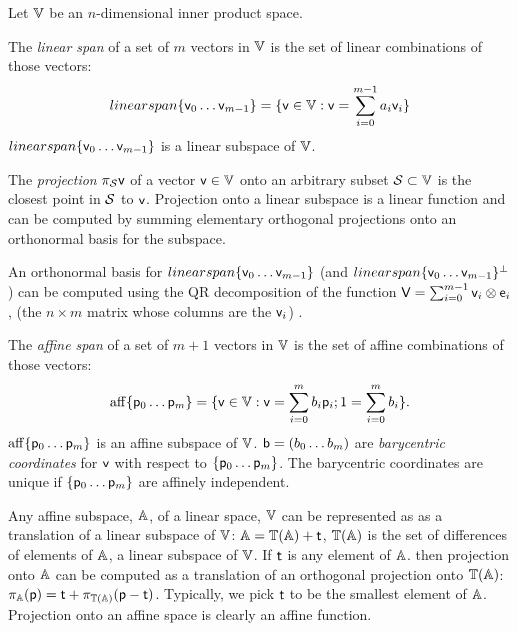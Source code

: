 \label{sec:spans-and-projections}

Let $\mathbb{V}$ be an $n$-dimensional inner product space.

The \textit{linear span} of a set of $m$ vectors in $\mathbb{V}$
is the set of linear combinations of those vectors:
\begin{equation}
\\linearspan\{ \mathsf{v}_0 \ldots \mathsf{v}_{m-1} \} = \{\mathsf{v} \in \mathbb{V} : \mathsf{v} = \sum_{i=0}^{m-1} a_i \mathsf{v}_i\}
\end{equation}
$\\linearspan\{ \mathsf{v}_0 \ldots \mathsf{v}_{m-1} \}$ is a linear subspace of $\mathbb{V}$.

The \textit{projection} $\pi_{\mathcal{S}} \mathsf{v}$ of a vector $\mathsf{v} \in \mathbb{V}$
onto an arbitrary subset $\mathcal{S} \subset \mathbb{V}$
is the closest point in $\mathcal{S}$ to $\mathsf{v}$.
Projection onto a linear subspace is a linear function and
can be computed by summing
elementary orthogonal projections onto an orthonormal basis for the subspace.

An orthonormal basis for $\\linearspan\{ \mathsf{v}_0 \ldots \mathsf{v}_{m-1} \}$
(and $\\linearspan\{ \mathsf{v}_0 \ldots \mathsf{v}_{m-1} \}^\perp$)
can be computed using the QR decomposition
of the function $\mathsf{V} = \sum_{i=0}^{m-1} \mathsf{v}_i \otimes \mathsf{e}_i$,
(the $n \times m$ matrix whose columns are the $\mathsf{v}_i$)
\cite[See][sec. 5.2 ]{golub-vanloan-2012}.

The \textit{affine span} of a set of $m+1$ vectors in $\mathbb{V}$
is the set of affine combinations of those vectors:
\begin{equation}
\mathrm{aff}\{ \mathsf{p}_0 \ldots \mathsf{p}_{m} \} = \{\mathsf{v} \in \mathbb{V} : \mathsf{v} = \sum_{i=0}^{m} b_i \mathsf{p}_i;
1 = \sum_{i=0}^{m} b_i \}.
\end{equation}
$\mathrm{aff}\{ \mathsf{p}_0 \ldots \mathsf{p}_{m} \}$ is an affine subspace of $\mathbb{V}$.
$\mathsf{b} = ( b_0 \ldots b_m )$ are \textit{barycentric coordinates}
for $\mathsf{v}$ with respect to $\{ \mathsf{p}_0 \ldots \mathsf{p}_{m} \}$.
The barycentric coordinates are unique if $\{ \mathsf{p}_0 \ldots \mathsf{p}_{m} \}$
are affinely independent.

Any affine subspace, $\mathbb{A}$, of a linear space, $\mathbb{V}$ can be represented as
as a translation of a linear subspace of $\mathbb{V}$:
$\mathbb{A} = \mathbb{T}(\mathbb{A}) + \mathsf{t}$,
$\mathbb{T}(\mathbb{A})$ is the set of differences of elements of $\mathbb{A}$,
a linear subspace of $\mathbb{V}$.
If $\mathsf{t}$ is any element of $\mathbb{A}$.
then projection onto $\mathbb{A}$
can be computed as a translation of an orthogonal projection onto $\mathbb{T}(\mathbb{A})$:
$\pi_{\mathbb{A}} (\mathsf{p}) = \mathsf{t} + \pi_{\mathbb{T}(\mathbb{A})} (\mathsf{p} - \mathsf{t})$.
Typically, we pick $\mathsf{t}$ to be the smallest element of $\mathbb{A}$.
Projection onto an affine space is clearly an affine function.

